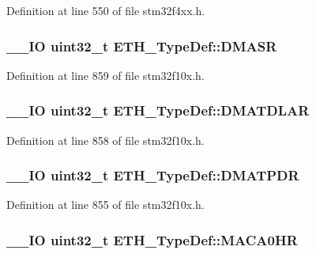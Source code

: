 Definition at line 550 of file stm32f4xx.\-h.

\hypertarget{struct_e_t_h___type_def_aa55a721ec8bb2239012aa7202e75abef}{
\subsubsection[{D\-M\-A\-S\-R}]{\setlength{\rightskip}{0pt plus 5cm}\-\_\-\-\_\-\-I\-O {\bf uint32\-\_\-t} E\-T\-H\-\_\-\-Type\-Def\-::\-D\-M\-A\-S\-R}}\label{struct_e_t_h___type_def_aa55a721ec8bb2239012aa7202e75abef}


Definition at line 859 of file stm32f10x.\-h.

\hypertarget{struct_e_t_h___type_def_a480a59fd0e4c6088a693fc8160831154}{
\subsubsection[{D\-M\-A\-T\-D\-L\-A\-R}]{\setlength{\rightskip}{0pt plus 5cm}\-\_\-\-\_\-\-I\-O {\bf uint32\-\_\-t} E\-T\-H\-\_\-\-Type\-Def\-::\-D\-M\-A\-T\-D\-L\-A\-R}}\label{struct_e_t_h___type_def_a480a59fd0e4c6088a693fc8160831154}


Definition at line 858 of file stm32f10x.\-h.

\hypertarget{struct_e_t_h___type_def_aab836646e2e03cde9af74e439e875403}{
\subsubsection[{D\-M\-A\-T\-P\-D\-R}]{\setlength{\rightskip}{0pt plus 5cm}\-\_\-\-\_\-\-I\-O {\bf uint32\-\_\-t} E\-T\-H\-\_\-\-Type\-Def\-::\-D\-M\-A\-T\-P\-D\-R}}\label{struct_e_t_h___type_def_aab836646e2e03cde9af74e439e875403}


Definition at line 855 of file stm32f10x.\-h.

\hypertarget{struct_e_t_h___type_def_aee8d5fcb4edf8c156e70188d7ab24423}{
\subsubsection[{M\-A\-C\-A0\-H\-R}]{\setlength{\rightskip}{0pt plus 5cm}\-\_\-\-\_\-\-I\-O {\bf uint32\-\_\-t} E\-T\-H\-\_\-\-Type\-Def\-::\-M\-A\-C\-A0\-H\-R}}\label{struct_e_t_h___type_def_aee8d5fcb4edf8c156e70188d7ab24423}


